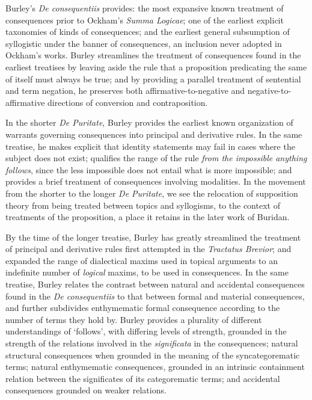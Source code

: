 	Burley's \textit{De consequentiis} provides: the most expansive known treatment of consequences prior to Ockham's \textit{Summa Logicae}; one of the earliest explicit taxonomies of kinds of consequences; and the earliest general subsumption of syllogistic under the banner of consequences, an inclusion never adopted in Ockham's works. Burley streamlines the treatment of consequences found in the earliest treatises by leaving aside the rule that a proposition predicating the same of itself must always be true; and by providing a parallel treatment of sentential and term negation, he preserves both affirmative-to-negative and negative-to-affirmative directions of conversion and contraposition.
	
	In the shorter \textit{De Puritate}, Burley provides the earliest known organization of warrants governing consequences into principal and derivative rules. In the same treatise, he makes explicit that identity statements may fail in cases where the subject does not exist; qualifies the range of the rule \textit{from the impossible anything follows}, since the less impossible does not entail what is more impossible; and provides a brief treatment of consequences involving modalities. In the movement from the shorter to the longer \textit{De Puritate}, we see the relocation of supposition theory from being treated between topics and syllogisms, to the context of treatments of the proposition, a place it retains in the later work of Buridan.
	
	By the time of the longer treatise, Burley has greatly streamlined the treatment of principal and derivative rules first attempted in the \textit{Tractatus Brevior}; and expanded the range of dialectical maxims used in topical arguments to an indefinite number of \textit{logical} maxims, to be used in consequences. In the same treatise, Burley relates the contrast between natural and accidental consequences found in the \textit{De consequentiis} to that between formal and material consequences, and further subdivides enthymematic formal consequence according to the number of terms they hold by. Burley provides a plurality of different understandings of `follows', with differing levels of strength, grounded in the strength of the relations involved in the \textit{significata} in the consequences; natural structural consequences when grounded in the meaning of the syncategorematic terms; natural enthymematic consequences, grounded in an intrinsic containment relation between the significates of its categorematic terms; and accidental consequences grounded on weaker relations. 
	
